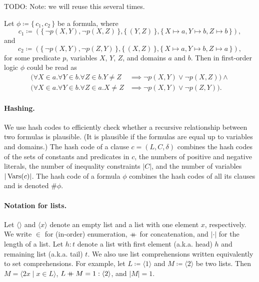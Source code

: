 TODO: Note: we will reuse this several times.
\begin{example} \label{example:first}
  Let $\phi \coloneqq \{\, c_1, c_2 \,\}$ be a formula, where
  \begin{equation} \label{phi1}
    c_1 \coloneqq (\{\, \neg p(X, Y), \neg p(X, Z) \,\}, \{\, (Y, Z) \,\}, \{\, X \mapsto a, Y \mapsto b, Z \mapsto b \,\}),
  \end{equation}
  and
  \begin{equation} \label{phi2}
    c_2 \coloneqq (\{\, \neg p(X, Y), \neg p(Z, Y) \,\}, \{\, (X, Z) \,\}, \{\, X \mapsto a, Y \mapsto b, Z \mapsto a \,\}),
  \end{equation}
  for some predicate $p$, variables $X$, $Y$, $Z$, and domains $a$ and $b$. Then in first-order logic $\phi$ could be read as
  \begin{align*}
    (\forall X \in a. \forall Y \in b. \forall Z \in b. Y \ne Z &\implies \neg p(X, Y) \lor \neg p(X, Z)) \land \\
    (\forall X \in a. \forall Y \in b. \forall Z \in a. X \ne Z &\implies \neg p(X, Y) \lor \neg p(Z, Y)).
  \end{align*}
\end{example}

\paragraph{Hashing.}
We use hash codes to efficiently check whether a recursive relationship between two formulas is plausible. (It is plausible if the formulas are equal up to variables and domains.) The hash code of a clause $c = (L, C, \delta)$ combines the hash codes of the sets of constants and predicates in $c$, the numbers of positive and negative literals, the number of inequality constraints $|C|$, and the number of variables $|\operatorname{Vars}(c)|$. The hash code of a formula $\phi$ combines the hash codes of all its clauses and is denoted $\#\phi$.

\paragraph{Notation for lists.}
Let $\langle\rangle$ and $\langle x \rangle$ denote an empty list and a list with one element $x$, respectively. We write $\in$ for (in-order) enumeration, $\mathbin{+\mkern-10mu+}$ for concatenation, and $|\cdot|$ for the length of a list. Let $h : t$ denote a list with first element (a.k.a. head) $h$ and remaining list (a.k.a. tail) $t$. We also use list comprehensions written equivalently to set comprehensions. For example, let $L \coloneqq \langle 1 \rangle$ and $M \coloneqq \langle 2 \rangle$ be two lists. Then $M = \langle 2x \mid x \in L \rangle$, $L \mathbin{+\mkern-10mu+} M = 1 : \langle 2 \rangle$, and $|M| = 1$.

